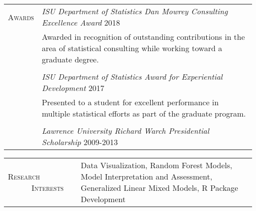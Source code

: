 \documentclass[11pt, oneside]{article}
\begin{document}
\noindent 
\begin{tabular}{p{3cm}p{14cm}}
\textsc{Awards} & \emph{ISU Department of Statistics Dan Mowrey Consulting Excellence Award} \hfill{2018}\\
& Awarded in recognition of outstanding contributions in the area of statistical consulting while working toward a graduate degree.\\
\\
& \emph{ISU Department of Statistics Award for Experiential Development} \hfill{2017}\\
& Presented to a student for excellent performance in multiple statistical efforts as part of the graduate program.\\
\\
& \emph{Lawrence University Richard Warch Presidential Scholarship} \hfill{2009-2013}
\end{tabular}

\vspace{0.5cm}

\noindent 
\begin{tabular}{p{3cm}p{14cm}}
\textsc{Research \ \ \ \ \ \ Interests} & Data Visualization, Random Forest Models, Model Interpretation and Assessment, Generalized Linear Mixed Models, R Package Development
\end{tabular}

\vspace{0.5cm}
\end{document}
